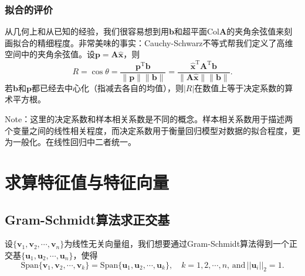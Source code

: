 \documentclass[a4paper, 12pt]{article}
\begin{document}
    \subsubsection{拟合的评价}

    从几何上和从已知的经验，我们很容易想到用$\boldsymbol b$和超平面$\mathrm{Col}\boldsymbol A$的夹角余弦值来刻画拟合的精细程度。非常美味的事实：Cauchy-Schwarz不等式帮我们定义了高维空间中的夹角余弦值。设$\boldsymbol p=\boldsymbol A\boldsymbol{\hat x}$，则
    \[
    R=\cos\theta=\frac{\boldsymbol p^\mathrm T\boldsymbol b}{\|\boldsymbol p\|\|\boldsymbol b\|}=\frac{\boldsymbol{\hat x}^\mathrm T\boldsymbol A^\mathrm T\boldsymbol b}{\|\boldsymbol A\boldsymbol{\hat x}\|\|\boldsymbol b\|}.
    \]
    若$\boldsymbol b$和$\boldsymbol p$都已经去中心化（指减去各自的均值），则$|R|$在数值上等于决定系数的算术平方根。

    Note：这里的决定系数和样本相关系数是不同的概念。样本相关系数用于描述两个变量之间的线性相关程度，而决定系数用于衡量回归模型对数据的拟合程度，更为一般化。在线性回归中二者统一。

    \section{求算特征值与特征向量}

	\subsection{Gram-Schmidt算法求正交基}

    设$\{\boldsymbol v_1,\boldsymbol v_2,\cdots,\boldsymbol v_n\}$为线性无关向量组，我们想要通过Gram-Schmidt算法得到一个正交基$\{\boldsymbol u_1,\boldsymbol u_2,\cdots,\boldsymbol u_n\}$，使得
    \[
    \mathrm{Span}\{\boldsymbol v_1,\boldsymbol v_2,\cdots,\boldsymbol v_k\}=\mathrm{Span}\{\boldsymbol u_1,\boldsymbol u_2,\cdots,\boldsymbol u_k\},\quad k=1,2,\cdots,n,\,\mathrm{and}\,||\boldsymbol u_i||_2=1.
    \]
\end{document}
